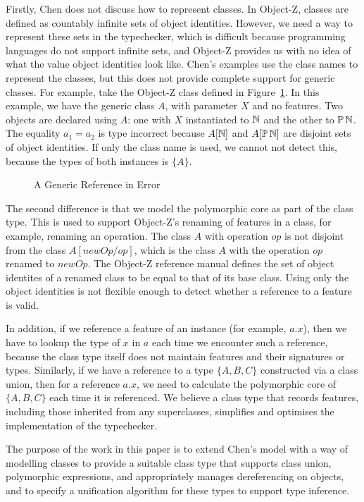 Firstly, Chen does not discuss how to represent classes. In Object-Z,
classes are defined as countably infinite sets of object
identities. However, we need a way to represent these sets in the
typechecker, which is difficult because programming languages do not
support infinite sets, and Object-Z provides us with no idea of what
the value object identities look like. Chen's examples use the class
names to represent the classes, but this does not provide complete
support for generic classes. For example, take the Object-Z class
defined in Figure~\ref{generic-class-A}.  In this example, we have the
generic class $A$, with parameter $X$ and no features.  Two objects
are declared using $A$: one with $X$ instantiated to ${\mathbb N}$ and the
other to $\power \nat$. The equality $a_{1} = a_{2}$ is type incorrect
because $A[{\mathbb N}]$ and $A[\power \nat]$ are disjoint sets of object
identities. If only the class name is used, we cannot not detect this,
because the types of both instances is $\{A\}$. 

\begin{figure}[t]

\caption{A Generic Reference in Error}
\label{generic-class-A}
\end{figure}

The second difference is that we model the polymorphic core as part of
the class type. This is used to support Object-Z's renaming of
features in a class, for example, renaming an operation. The class $A$
with operation $op$ is not disjoint from the class $A[newOp/op]$,
which is the class $A$ with the operation $op$ renamed to $newOp$. The
Object-Z reference manual \cite{smith00} defines the set of object
identites of a renamed class to be equal to that of its base
class. Using only the object identities is not flexible enough to
detect whether a reference to a feature is valid.

In addition, if we reference a feature of an instance (for example,
$a.x$), then we have to lookup the type of $x$ in $a$ each time we
encounter such a reference, because the class type itself does not
maintain features and their signatures or types.  Similarly, if we
have a reference to a type $\{ A, B, C\}$ constructed via a class
union, then for a reference $a.x$, we need to calculate the
polymorphic core of $\{A,B,C\}$ each time it is referenced. We believe
a class type that records features, including those inherited from any
superclasses, simplifies and optimises the implementation of the
typechecker.

The purpose of the work in this paper is to extend Chen's model with a
way of modelling classes to provide a suitable class type that
supports class union, polymorphic expressions, and appropriately
manages dereferencing on objects, and to specify a unification
algorithm for these types to support type inference.

